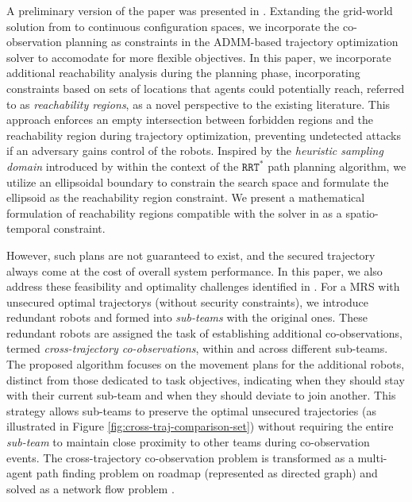 \documentclass[10pt,twocolumn,twoside]{IEEEtran}
\begin{document}
A preliminary version of the paper was presented in \cite{yang2020multi,yang2021multi}. Extanding the grid-world solution from \cite{wardega2019resilience} to continuous configuration spaces, we incorporate the co-observation planning as constraints in the ADMM-based trajectory optimization solver to accomodate for more flexible objectives. In this paper, we incorporate additional reachability analysis during the planning phase, incorporating constraints based on sets of locations that agents could potentially reach, referred to as \emph{reachability regions}, as a novel perspective to the existing literature. This approach enforces an empty intersection between forbidden regions and the reachability region during trajectory optimization, preventing undetected attacks if an adversary gains control of the robots. Inspired by the \emph{heuristic sampling domain} introduced by \cite{gammell2014informed} within the context of the $\mathtt{RRT^*}$ path planning algorithm, we utilize an ellipsoidal boundary to constrain the search space and formulate the ellipsoid as the reachability region constraint. We present a mathematical formulation of reachability regions compatible with the solver in \cite{yang2020multi} as a spatio-temporal constraint. 

However, such plans are not guaranteed to exist, and the secured trajectory always come at the cost of overall system performance. In this paper, we also address these feasibility and optimality challenges identified in \cite{wardega2023hola, yang2020multi, yang2021multi}. For a MRS with unsecured optimal trajectorys (without security constraints), we introduce redundant robots and formed into \emph{sub-teams} with the original ones. These redundant robots are assigned the task of establishing additional co-observations, termed \emph{cross-trajectory co-observations}, within and across different sub-teams. The proposed algorithm focuses on the movement plans for the additional robots, distinct from those dedicated to task objectives, indicating when they should stay with their current sub-team and when they should deviate to join another. This strategy allows sub-teams to preserve the optimal unsecured trajectories (as illustrated in Figure \ref{fig:cross-traj-comparison-set}) without requiring the entire \emph{sub-team} to maintain close proximity to other teams during co-observation events. The cross-trajectory co-observation problem is transformed as a multi-agent path finding problem on roadmap (represented as directed graph) and solved as a network flow problem \cite{yu2013multi}.
\end{document}
